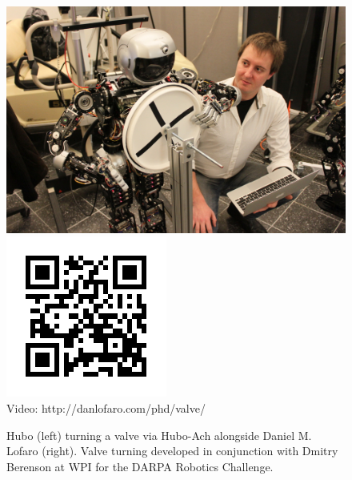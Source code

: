 \begin{figure}[thpb]
  \centering
      \includegraphics[width=0.93\columnwidth]{./pix/IMG_9107-small.jpg}
      \includegraphics{./qrcode/qrcode-valve.png}\\
      Video: http://danlofaro.com/phd/valve/
\caption{Hubo (left) turning a valve via Hubo-Ach alongside Daniel
  M. Lofaro (right).  Valve turning developed in conjunction with
  Dmitry Berenson at WPI for the DARPA Robotics Challenge.}
  \label{fig:valve}
\end{figure}